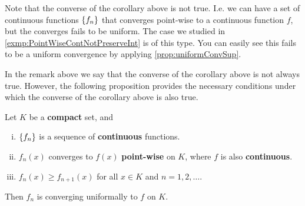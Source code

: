 \begin{remark}
	Note that the converse of the corollary above is not true. I.e. we can have a set of continuous functions $ \{f_n\} $ that converges point-wise to a continuous function $ f  $, but the converges fails to be uniform. The case we studied in \autoref{exmp:PointWiseContNotPreserveInt} is of this type. You can easily see this fails to be a uniform convergence by applying \autoref{prop:uniformConvSup}.
\end{remark}

In the remark above we say that the converse of the corollary above is not always true. However, the following proposition provides the necessary conditions under which the converse of the corollary above is also true. 


\begin{proposition}
	Let $ K $ be a \textbf{compact} set, and 
	\begin{enumerate}[(i),noitemsep]
		\item $ \{f_n\} $ is a sequence of \textbf{continuous} functions.
		\item $ f_n(x) $ converges to $ f(x) $ \textbf{point-wise} on $ K $, where $ f $ is also \textbf{continuous}.
		\item $ f_n(x) \geq f_{n+1}(x) $ for all $ x\in K $ and $ n=1,2,\hdots. $
	\end{enumerate}
	Then $ f_n $ is converging uniformally to $ f $ on $  K $.
\end{proposition}

